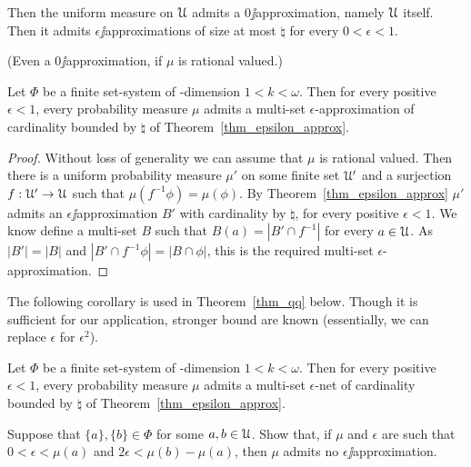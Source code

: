 \documentclass[combinatorics.tex]{subfiles}
\begin{document}
Then the uniform measure on $\EuScript U$ admits a $0\jj$approximation, namely $\EuScript U$ itself.
Then it admits $\epsilon\jj$approximations of size at most $\natural$ for every $0<\epsilon<1$.

% 
(Even a $0\jj$approximation, if $\mu$ is rational valued.)\QED

\begin{corollary}\label{coroll_epsilon_multiapprox}Let $\Phi$ be a finite set-system of \vc-dimension $1<k<\omega$.
Then for every positive $\epsilon<1$, every probability measure $\mu$ admits a multi-set $\epsilon$-approximation of cardinality bounded by $\natural$ of Theorem~\ref{thm_epsilon_approx}.
\end{corollary}
\begin{proof}
Without loss of generality we can assume that $\mu$ is rational valued.
Then there is a uniform probability measure $\mu'$ on some finite set $\EuScript U'$ and a surjection $f:\EuScript U'\to\EuScript U$ such that $\mu(f^{-1}\phi)=\mu(\phi)$.
By Theorem~\ref{thm_epsilon_approx} $\mu'$ admits an $\epsilon\jj$approximation $B'$ with cardinality by $\natural$, for every positive $\epsilon<1$.
We know define a multi-set $B$ such that $B(a)=|B'\cap f^{-1}|$ for every $a\in\EuScript U$.
As $|B'|=|B|$ and $|B'\cap f^{-1}\phi|=|B\cap\phi|$, this is the required multi-set $\epsilon$-approximation.
\end{proof}

The following corollary is used in Theorem~\ref{thm_qq} below.
Though it is sufficient for our application, stronger bound are known (essentially, we can replace $\epsilon$ for $\epsilon^2$).



\begin{corollary}\label{coroll_epsilon_net}
Let $\Phi$ be a finite set-system of \vc-dimension $1<k<\omega$.
Then for every positive $\epsilon<1$, every probability measure $\mu$ admits a multi-set $\epsilon$-net of cardinality bounded by $\natural$ of Theorem~\ref{thm_epsilon_approx}.
\end{corollary}

\begin{exercise}\label{ex_counterexample}
Suppose that $\{a\},\{b\}\in\Phi$ for some $a,b\in\EuScript U$.
Show that, if $\mu$ and $\epsilon$ are such that $0<\epsilon<\mu(a)$ and $2\epsilon<\mu(b)-\mu(a)$, then $\mu$ admits no $\epsilon\jj$approximation.\QED
\end{exercise}



 
 
\end{document}
